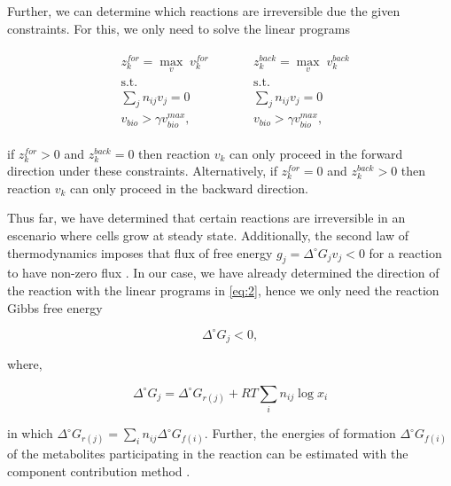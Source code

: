 \documentclass[12pt]{article}
\begin{document}
  Further, we can determine which reactions are irreversible due the given constraints. For this, we only need to solve the linear programs

  \begin{align}
    \label{eq:2}
    \begin{aligned}
      &z^{for}_k=\max_{v}\; v^{for}_k
      \\
      &\mathrm{s.t.}
      \\
      & \sum_j n_{ij} v_j = 0
      \\
      & v_{bio} > \gamma v^{max}_{bio},
    \end{aligned}
    \qquad
    \begin{aligned}
      &z^{back}_k=\max_{v}\; v^{back}_k
      \\
      &\mathrm{s.t.}
      \\
      & \sum_j n_{ij} v_j = 0
      \\
      & v_{bio} > \gamma v^{max}_{bio},
    \end{aligned}
  \end{align}

  if $z^{for}_{k} > 0$ and $z^{back}_{k} = 0$ then reaction $v_k$ can only proceed in the forward direction under these constraints. Alternatively, if $z^{for}_{k} = 0$ and $z^{back}_{k} > 0$ then reaction $v_k$ can only proceed in the backward direction.

  Thus far, we have determined that certain reactions are irreversible in an escenario where cells grow at steady state. Additionally, the second law of thermodynamics imposes that flux of free energy $g_j = \Delta^{\circ} G_j v_j < 0$ for a reaction to have non-zero flux \cite{Kondepudi2014a}. In our case, we have already determined the direction of the reaction with the linear programs in \ref{eq:2}, hence we only need the reaction Gibbs free energy

  \begin{equation}
    \label{eq:3}
    \Delta^{\circ} G_j < 0,
  \end{equation}

  \noindent where,

  \begin{equation}
    \label{eq:4}
    \Delta^{\circ} G_j = \Delta^{\circ} G_{r(j)} + RT \sum_i n_{ij} \log{x_i}
  \end{equation}

  \noindent in which $\Delta^{\circ} G_{r(j)} = \sum_i n_{ij}\Delta^{\circ} G_{f(i)}$. Further, the energies of formation $\Delta^{\circ} G_{f(i)}$ of the metabolites participating in the reaction can be estimated with the component contribution method \cite{Noor2013}.
\end{document}
